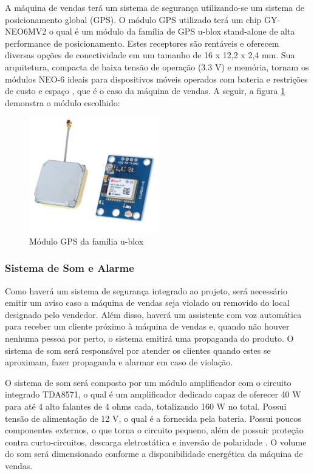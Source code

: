 A máquina de vendas terá um sistema de segurança utilizando-se um sistema de posicionamento global (GPS). O módulo GPS utilizado terá um chip GY-NEO6MV2 o qual é um módulo da família de GPS u-blox stand-alone de alta performance de posicionamento. Estes receptores são rentáveis e oferecem diversas opções de conectividade em um tamanho de 16 x 12,2 x 2,4 mm. Sua arquitetura, compacta de baixa tensão de operação (3.3 V) e memória, tornam os módulos NEO-6 ideais para dispositivos móveis operados com bateria e restrições de custo e espaço \cite{mq1}, que é o caso da máquina de vendas. A seguir, a figura \ref{fig:GPS} demonstra o módulo escolhido:

\begin{figure}[H]
	\centering
    \includegraphics[width=0.5\textwidth]{figuras/modulo_gps}
    \caption{Módulo GPS da família u-blox}
    \label{fig:GPS}
\end{figure}

\subsubsection{Sistema de Som e Alarme}

Como haverá um sistema de segurança integrado ao projeto, será necessário emitir um aviso caso a máquina de vendas seja violado ou removido do local designado pelo vendedor. Além disso, haverá um assistente com voz automática para receber um cliente próximo à máquina de vendas e, quando não houver nenhuma pessoa por perto, o sistema emitirá uma propaganda do produto. O sistema de som será responsável por atender os clientes quando estes se aproximam, fazer propaganda e alarmar em caso de violação.

O sistema de som será composto por um módulo amplificador com o circuito integrado TDA8571, o qual é um amplificador dedicado capaz de oferecer 40 W para até 4 alto falantes de 4 ohms cada, totalizando 160 W no total. Possui tensão de alimentação de 12 V, o qual é a fornecida pela bateria. Possui poucos componentes externos, o que torna o circuito pequeno, além de possuir proteção contra curto-circuitos, descarga eletrostática e inversão de polaridade \cite{mq2}. O volume do som será dimensionado conforme a disponibilidade energética da máquina de vendas.

